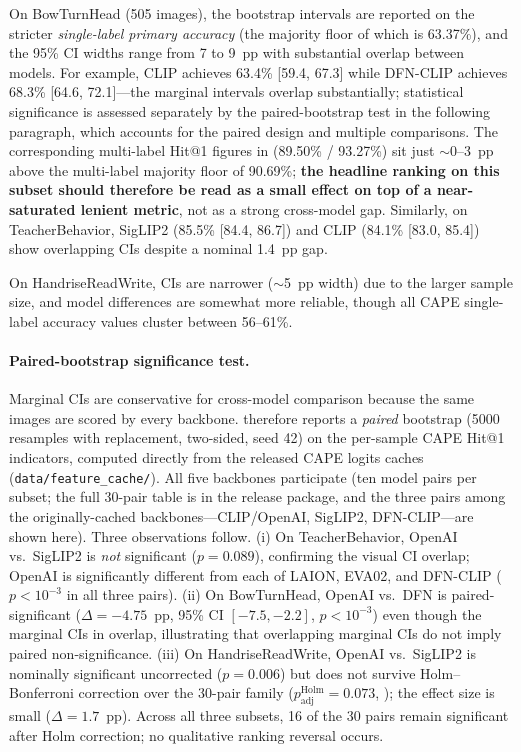 \documentclass[symmetry,article,submit,pdftex,moreauthors]{Definitions/mdpi}
\begin{document}
On BowTurnHead (505 images), the bootstrap intervals are reported on the stricter \emph{single-label primary accuracy} (the majority floor of which is 63.37\%), and the 95\% CI widths range from 7 to 9~pp with substantial overlap between models. For example, CLIP achieves 63.4\% [59.4, 67.3] while DFN-CLIP achieves 68.3\% [64.6, 72.1]---the marginal intervals overlap substantially; statistical significance is assessed separately by the paired-bootstrap test in the following paragraph, which accounts for the paired design and multiple comparisons. The corresponding multi-label Hit@1 figures in  (89.50\% / 93.27\%) sit just $\sim$0--3~pp above the multi-label majority floor of 90.69\%; \textbf{the headline ranking on this subset should therefore be read as a small effect on top of a near-saturated lenient metric}, not as a strong cross-model gap. Similarly, on TeacherBehavior, SigLIP2 (85.5\% [84.4, 86.7]) and CLIP (84.1\% [83.0, 85.4]) show overlapping CIs despite a nominal 1.4~pp gap.

On HandriseReadWrite, CIs are narrower ($\sim$5~pp width) due to the larger sample size, and model differences are somewhat more reliable, though all CAPE single-label accuracy values cluster between 56--61\%.

\paragraph{Paired-bootstrap significance test.} Marginal CIs are conservative for cross-model comparison because the same images are scored by every backbone.  therefore reports a \emph{paired} bootstrap (5000 resamples with replacement, two-sided, seed 42) on the per-sample CAPE Hit@1 indicators, computed directly from the released CAPE logits caches (\texttt{data/feature\_cache/}). All five backbones participate (ten model pairs per subset; the full 30-pair table is in the release package, and the three pairs among the originally-cached backbones---CLIP/OpenAI, SigLIP2, DFN-CLIP---are shown here). Three observations follow. (i) On TeacherBehavior, OpenAI vs.\ SigLIP2 is \emph{not} significant ($p=0.089$), confirming the visual CI overlap; OpenAI is significantly different from each of LAION, EVA02, and DFN-CLIP ($p<10^{-3}$ in all three pairs). (ii) On BowTurnHead, OpenAI vs.\ DFN is paired-significant ($\Delta=-4.75$~pp, 95\% CI $[-7.5,-2.2]$, $p<10^{-3}$) even though the marginal CIs in  overlap, illustrating that overlapping marginal CIs do not imply paired non-significance. (iii) On HandriseReadWrite, OpenAI vs.\ SigLIP2 is nominally significant uncorrected ($p=0.006$) but does not survive Holm--Bonferroni correction over the 30-pair family ($p_{\text{adj}}^{\text{Holm}}=0.073$, ); the effect size is small ($\Delta=1.7$~pp). Across all three subsets, 16 of the 30 pairs remain significant after Holm correction; no qualitative ranking reversal occurs.
\end{document}
